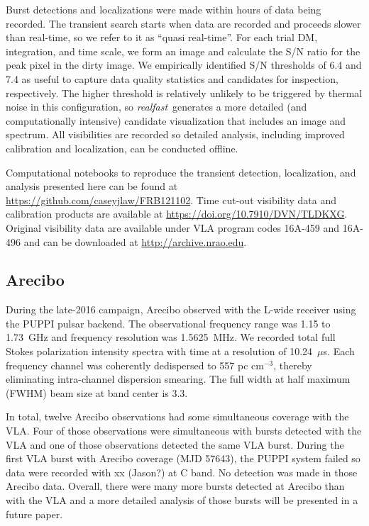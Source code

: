 \documentclass[twocolumn]{aastex61}
\newcommand{\rf}{\emph{realfast}}
\begin{document}
Burst detections and localizations were made within hours of data being recorded. The transient search starts when data are recorded and proceeds slower than real-time, so we refer to it as ``quasi real-time''. For each trial DM, integration, and time scale, we form an image and calculate the S/N ratio for the peak pixel in the dirty image. We empirically identified S/N thresholds of 6.4 and 7.4 as useful to capture data quality statistics and candidates for inspection, respectively. The higher threshold is relatively unlikely to be triggered by thermal noise in this configuration, so \rf\ generates a more detailed (and computationally intensive) candidate visualization that includes an image and spectrum. All visibilities are recorded so detailed analysis, including improved calibration and localization, can be conducted offline. 

Computational notebooks to reproduce the transient detection, localization, and analysis presented here can be found at \url{https://github.com/caseyjlaw/FRB121102}. Time cut-out visibility data and calibration products are available at \url{https://doi.org/10.7910/DVN/TLDKXG}. Original visibility data are available under VLA program codes 16A-459 and 16A-496 and can be downloaded at \url{http://archive.nrao.edu}.

\subsection{Arecibo}

During the late-2016 campaign, Arecibo observed with the L-wide receiver using the PUPPI pulsar backend. The observational frequency range was 1.15 to 1.73~GHz and frequency resolution was 1.5625~MHz. We recorded total full Stokes polarization intensity spectra with time at a resolution of 10.24~$\mu$s. Each frequency channel was coherently dedispersed to 557 pc cm$^{-3}$, thereby eliminating intra-channel dispersion smearing. The full width at half maximum (FWHM) beam size at band center is 3.3\arcmin.

In total, twelve Arecibo observations had some simultaneous coverage with the VLA. Four of those observations were simultaneous with bursts detected with the VLA and one of those observations detected the same VLA burst. During the first VLA burst with Arecibo coverage (MJD 57643), the PUPPI system failed so data were recorded with {\color{red} xx (Jason?)} at C band. No detection was made in those Arecibo data. Overall, there were many more bursts detected at Arecibo than with the VLA and a more detailed analysis of those bursts will be presented in a future paper.
\end{document}
